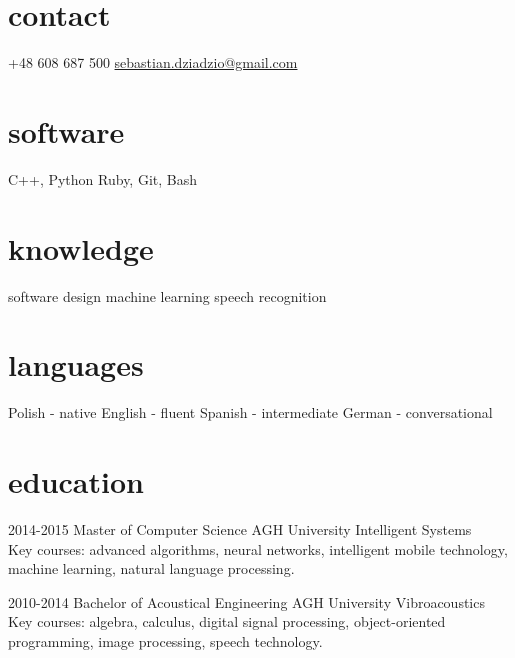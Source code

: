 \documentclass[]{friggeri-cv} %
\begin{document}


\begin{aside} %
\section{contact}
+48 608 687 500
\href{mailto:sebastian.dziadzio@gmail.com}{sebastian.dziadzio@gmail.com}
\href{http://pl.linkedin.com/in/sebastiandziadzio}{\color{gray} \faLinkedinSign} \href{https://github.com/sebastiandziadzio}{\color{gray} \faGithubSign} \href{https://twitter.com/sebadzia}{\color{gray} \faTwitterSign}
\section{software}
C++, Python
Ruby, Git, Bash
\section{knowledge}
software design
machine learning
speech recognition
\section{languages}
Polish - native
English - fluent
Spanish - intermediate
German - conversational
\end{aside}


\section{education}

\begin{entrylist}

\entry
{2014-2015}
{Master of Computer Science}
{AGH University}
{Intelligent Systems \\ Key courses: advanced algorithms, neural networks, intelligent mobile technology, machine learning, natural language processing.\\}

\entry
{2010-2014}
{Bachelor of Acoustical Engineering}
{AGH University}
{Vibroacoustics \\ Key courses: algebra, calculus, digital signal processing, object-oriented programming, image processing, speech technology.}
\end{entrylist}
\end{document}
